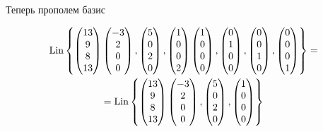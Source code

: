 \documentclass[12pt, a4paper]{article}
\begin{document}
    Теперь прополем базис

    \begin{multline}
        \operatorname{Lin} \left\{ \begin{pmatrix} 13 \\ 9 \\ 8 \\ 13 \end{pmatrix} \begin{pmatrix} -3\\2\\0\\0 \end{pmatrix}, \begin{pmatrix} 5\\0\\2\\0 \end{pmatrix}, \begin{pmatrix} 1\\0\\0\\2 \end{pmatrix} \begin{pmatrix} 1\\0\\0\\0 \end{pmatrix}, \begin{pmatrix} 0\\1\\0\\0 \end{pmatrix}, \begin{pmatrix} 0\\0\\1\\0 \end{pmatrix}, \begin{pmatrix} 0\\0\\0\\1 \end{pmatrix} \right\} = \\
        = \operatorname{Lin} \left\{ \begin{pmatrix} 13 \\ 9 \\ 8 \\ 13 \end{pmatrix} \begin{pmatrix} -3\\2\\0\\0 \end{pmatrix}, \begin{pmatrix} 5\\0\\2\\0 \end{pmatrix}, \begin{pmatrix} 1\\0\\0\\0 \end{pmatrix} \right\}
    \end{multline}
\end{document}
